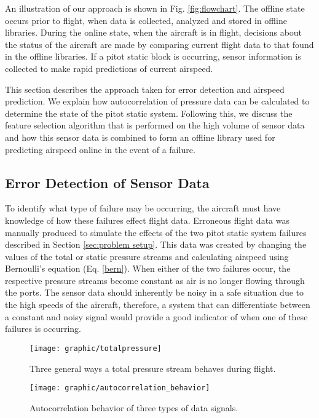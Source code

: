 \documentclass[]{aiaa-tc}
\begin{document}
An illustration of our approach is shown in Fig. \ref{fig:flowchart}. The offline state occurs prior to flight, when data is collected, analyzed and stored in offline libraries. During the online state, when the aircraft is in flight, decisions about the status of the aircraft are made by comparing current flight data to that found in the offline libraries. If a pitot static block is occurring, sensor information is collected to make rapid predictions of current airspeed. 

This section describes the approach taken for error detection and airspeed prediction. We explain how autocorrelation of pressure data can be calculated to determine the state of the pitot static system.  Following this, we discuss the feature selection algorithm that is performed on the high volume of sensor data and how this sensor data is combined to form an offline library used for predicting airspeed online in the event of a failure. 


\subsection{Error Detection of Sensor Data }
\label{sec:error detection}

To identify what type of failure may be occurring, the aircraft must have knowledge of how these failures effect flight data. Erroneous flight data was manually produced to simulate the effects of the two pitot static system failures described in Section \ref{sec:problem setup}. This data was created by changing the values of the total or static pressure streams and calculating airspeed using Bernoulli's equation (Eq. \ref{bern}). When either of the two failures occur, the respective pressure streams become constant as air is no longer flowing through the ports. The sensor data should inherently be noisy in a safe situation due to the high speeds of the aircraft, therefore, a system that can differentiate between a constant and noisy signal would provide a good indicator of when one of these failures is occurring. 

\begin{figure}
\centering
\texttt{[image: graphic/totalpressure]}
\caption{\label{fig:pressurebehavior} Three general ways a total pressure stream behaves during flight.}
\end{figure}

\begin{figure}
\centering
\texttt{[image: graphic/autocorrelation\_behavior]}
\caption{\label{fig:autocorrelationbehavior} Autocorrelation behavior of three types of data signals.}
\end{figure}
\end{document}
